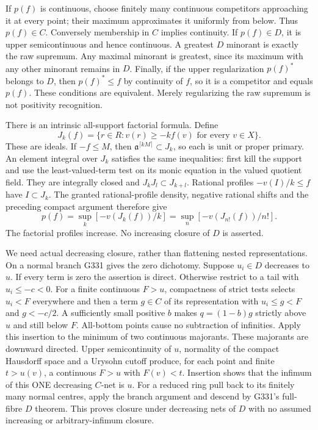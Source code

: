 \documentclass[11pt]{article}
\begin{document}
If \(p(f)\) is continuous, choose finitely many continuous competitors approaching it at every point; their maximum approximates it uniformly from below. Thus \(p(f)\in C\). Conversely membership in \(C\) implies continuity. If \(p(f)\in D\), it is upper semicontinuous and hence continuous. A greatest \(D\) minorant is exactly the raw supremum. Any maximal minorant is greatest, since its maximum with any other minorant remains in \(D\). Finally, if the upper regularization \(p(f)^*\) belongs to \(D\), then \(p(f)^*\le f\) by continuity of \(f\), so it is a competitor and equals \(p(f)\). These conditions are equivalent. Merely regularizing the raw supremum is not positivity recognition.

There is an intrinsic all-support factorial formula. Define
\[
J_k(f)=\{r\in R:v(r)\ge-kf(v)\text{ for every }v\in X\}.
\]
These are ideals. If \(-f\le M\), then \(\mathfrak a^{\lceil kM\rceil}\subset J_k\), so each is unit or proper primary. An element integral over \(J_k\) satisfies the same inequalities: first kill the support and use the least-valued-term test on its monic equation in the valued quotient field. They are integrally closed and \(J_kJ_l\subset J_{k+l}\). Rational profiles \(-v(I)/k\le f\) have \(I\subset J_k\). The granted rational-profile density, negative rational shifts and the preceding compact argument therefore give
\[
p(f)=\sup_k[-v(J_k(f))/k]
     =\sup_n[-v(J_{n!}(f))/n!].
\]
The factorial profiles increase. No increasing closure of \(D\) is asserted.

We need actual decreasing closure, rather than flattening nested representations. On a normal branch G331 gives the zero dichotomy. Suppose \(u_i\in D\) decreases to \(u\). If every term is zero the assertion is direct. Otherwise restrict to a tail with \(u_i\le-c<0\). For a finite continuous \(F>u\), compactness of strict tests selects \(u_i<F\) everywhere and then a term \(g\in C\) of its representation with \(u_i\le g<F\) and \(g<-c/2\). A sufficiently small positive \(b\) makes \(q=(1-b)g\) strictly above \(u\) and still below \(F\). All-bottom points cause no subtraction of infinities. Apply this insertion to the minimum of two continuous majorants. These majorants are downward directed. Upper semicontinuity of \(u\), normality of the compact Hausdorff space and a Urysohn cutoff produce, for each point and finite \(t>u(v)\), a continuous \(F>u\) with \(F(v)<t\). Insertion shows that the infimum of this ONE decreasing \(C\)-net is \(u\). For a reduced ring pull back to its finitely many normal centres, apply the branch argument and descend by G331's full-fibre \(D\) theorem. This proves closure under decreasing nets of \(D\) with no assumed increasing or arbitrary-infimum closure.
\end{document}
